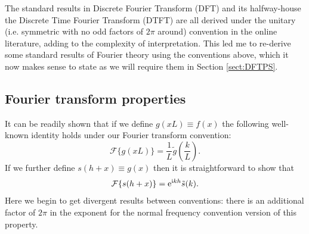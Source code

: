 \documentclass[preprint]{aastex}
\newcommand{\mi}{{\rm i}}
\newcommand{\me}{{\rm e}}
\begin{document}
The standard results in Discrete Fourier Transform (DFT) and its
halfway-house the Discrete Time Fourier Transform (DTFT) are all
derived under the unitary (i.e. symmetric with no odd factors of $2
\pi$ around) convention in the online literature, adding to the complexity of
interpretation.  This led me to re-derive some standard results of
Fourier theory using the conventions above, which it now makes sense
to state as we will require them in Section \ref{sect:DFTPS}.

\subsection{Fourier transform properties}
It can be readily shown that if we define $g(x L) \equiv f(x)$ the following well-known identity holds
under our Fourier transform convention:
\begin{equation}
\mathcal{F}\{g(x L)\} = \frac{1}{L}
\tilde{g}\left(\frac{k}{L}\right). \label{eq:gmult}
\end{equation}
If we further define $s(h + x) \equiv g(x)$ then it is straightforward
to show that
\begin{equation}
\mathcal{F}\{ s(h + x) \} = \me^{\mi k h} \tilde{s}(k).  \label{eq:sadd}
\end{equation}
Here we begin to get divergent results between conventions: there is
an additional factor of $2\pi$ in the exponent for the normal frequency
convention version of this property.
\end{document}
